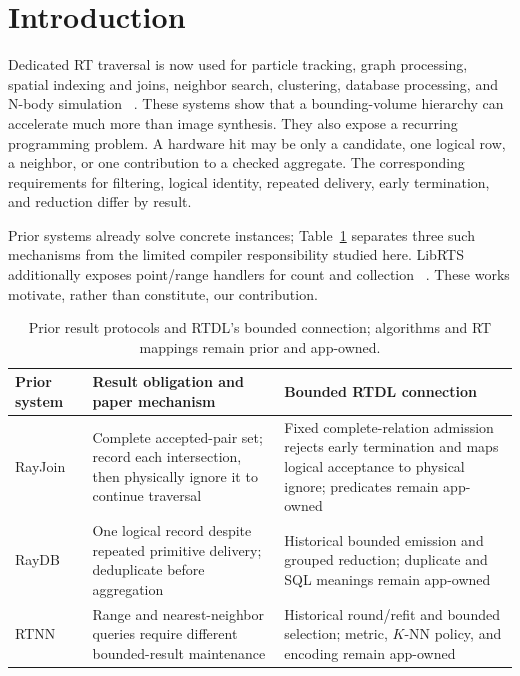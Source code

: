 \documentclass[sigplan,screen,review,anonymous]{acmart}
\newcommand{\rtdl}{\textsc{RTDL}\xspace}
\begin{document}

\maketitle

\section{Introduction}

Dedicated RT traversal is now used for particle tracking, graph processing,
spatial indexing and joins, neighbor search, clustering, database processing,
and N-body simulation
~\cite{wang2022particle,xiao2025rtgraph,geng2025librts,geng2024rayjoin,zhu2022rtnn,nagarajan2023rtdbscan,shi2025raydb,nagarajan2025rtbarneshut,meneses2026rtcoresurvey}.
These systems show that a bounding-volume hierarchy can accelerate much more
than image synthesis. They also expose a recurring programming problem. A
hardware hit may be only a candidate, one logical row, a neighbor, or one
contribution to a checked aggregate. The corresponding requirements for
filtering, logical identity, repeated delivery, early termination, and
reduction differ by result.

Prior systems already solve concrete instances; Table~\ref{tab:prior-obligations}
separates three such mechanisms from the limited compiler responsibility studied
here. LibRTS additionally exposes point/range handlers for count and collection
~\cite{geng2025librts}. These works motivate, rather than constitute, our
contribution.

\begin{table}[t]
  \caption{Prior result protocols and \rtdl's bounded connection; algorithms
  and RT mappings remain prior and app-owned.}
  \label{tab:prior-obligations}
  \scriptsize
  \begin{tabularx}{\textwidth}{@{}p{}p{}X@{}}
    \toprule
    Prior system & Result obligation and paper mechanism & Bounded \rtdl connection \\
    \midrule
    RayJoin~\cite{geng2024rayjoin} & Complete accepted-pair set; record each
    intersection, then physically ignore it to continue traversal & Fixed
    complete-relation admission rejects early termination and maps logical
    acceptance to physical ignore; predicates remain app-owned \\
    RayDB~\cite{shi2025raydb} & One logical record despite repeated primitive
    delivery; deduplicate before aggregation & Historical bounded emission and
    grouped reduction; duplicate and SQL meanings remain app-owned \\
    RTNN~\cite{zhu2022rtnn} & Range and nearest-neighbor queries require
    different bounded-result maintenance & Historical round/refit and bounded
    selection; metric, $K$-NN policy, and encoding remain app-owned \\
    \bottomrule
  \end{tabularx}
\end{table}
\end{document}

